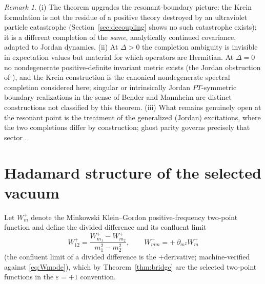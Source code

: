 \documentclass[11pt]{article}
\theoremstyle{definition}
\theoremstyle{remark}
\newtheorem{remark}[theorem]{Remark}
\begin{document}
\begin{remark}
(i) The theorem upgrades the resonant-boundary picture: the Krein
formulation is not the residue of a positive theory destroyed by an
ultraviolet particle catastrophe (Section~\ref{sec:decoupling} shows no
such catastrophe exists); it is a different completion of the
\emph{same}, analytically continued covariance, adapted to Jordan
dynamics.  (ii) At $\Delta>0$ the completion ambiguity is invisible in
expectation values but material for which operators are Hermitian.  At
$\Delta=0$ no nondegenerate positive-definite invariant metric exists
(the Jordan obstruction of \cite{companion1}), and the Krein
construction is the canonical nondegenerate spectral completion
considered here; singular or intrinsically Jordan $PT$-symmetric
boundary realizations in the sense of Bender and Mannheim
\cite{BM2008PRD} are distinct constructions not classified by this
theorem.  (iii) What
remains genuinely open at the resonant point is the treatment of the
generalized (Jordan) excitations, where the two completions differ by
construction; ghost parity governs precisely that sector \cite{BT2026}.
\end{remark}

\section{Hadamard structure of the selected vacuum}\label{sec:hadamard}

Let $W^+_m$ denote the Minkowski Klein--Gordon positive-frequency
two-point function and define the divided difference and its confluent
limit
\begin{equation}
W^+_{12}=\frac{W^+_{m_1}-W^+_{m_2}}{m_1^2-m_2^2},
\qquad
W^+_{mm}=+\,\partial_{m^2}W^+_m
\end{equation}
(the confluent limit of a divided difference is the $+$derivative;
machine-verified against \eqref{eq:Wmode}), which by
Theorem~\ref{thm:bridge} are the selected two-point functions in the
$\varepsilon=+1$ convention.
\end{document}
